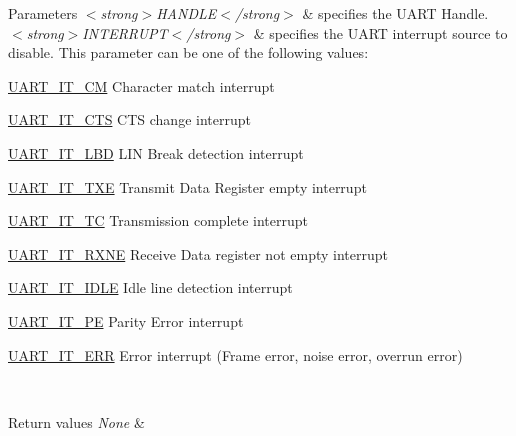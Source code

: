 \begin{DoxyParams}{Parameters}
{\em $<$strong$>$\+H\+A\+N\+D\+L\+E$<$/strong$>$} & specifies the U\+A\+RT Handle. \\
\hline
{\em $<$strong$>$\+I\+N\+T\+E\+R\+R\+U\+P\+T$<$/strong$>$} & specifies the U\+A\+RT interrupt source to disable. This parameter can be one of the following values\+: \begin{DoxyItemize}
\item \mbox{\hyperlink{group___u_a_r_t___interrupt__definition_ga4c22e866bce68975a180828012489106}{U\+A\+R\+T\+\_\+\+I\+T\+\_\+\+CM}} Character match interrupt \item \mbox{\hyperlink{group___u_a_r_t___interrupt__definition_ga986d271478550f9afa918262ca642333}{U\+A\+R\+T\+\_\+\+I\+T\+\_\+\+C\+TS}} C\+TS change interrupt \item \mbox{\hyperlink{group___u_a_r_t___interrupt__definition_gabca5e77508dc2dd9aa26fcb683d9b988}{U\+A\+R\+T\+\_\+\+I\+T\+\_\+\+L\+BD}} L\+IN Break detection interrupt \item \mbox{\hyperlink{group___u_a_r_t___interrupt__definition_ga552636e2af516d578856f5ee2ba71ed7}{U\+A\+R\+T\+\_\+\+I\+T\+\_\+\+T\+XE}} Transmit Data Register empty interrupt \item \mbox{\hyperlink{group___u_a_r_t___interrupt__definition_gab9a4dc4e8cea354fd60f4117513b2004}{U\+A\+R\+T\+\_\+\+I\+T\+\_\+\+TC}} Transmission complete interrupt \item \mbox{\hyperlink{group___u_a_r_t___interrupt__definition_gac1bedf7a65eb8c3f3c4b52bdb24b139d}{U\+A\+R\+T\+\_\+\+I\+T\+\_\+\+R\+X\+NE}} Receive Data register not empty interrupt \item \mbox{\hyperlink{group___u_a_r_t___interrupt__definition_ga9781808d4f9999061fc2da36572191d9}{U\+A\+R\+T\+\_\+\+I\+T\+\_\+\+I\+D\+LE}} Idle line detection interrupt \item \mbox{\hyperlink{group___u_a_r_t___interrupt__definition_ga55f922ddcf513509710ade5d7c40a1db}{U\+A\+R\+T\+\_\+\+I\+T\+\_\+\+PE}} Parity Error interrupt \item \mbox{\hyperlink{group___u_a_r_t___interrupt__definition_ga8eb26d8edd9bf78ae8d3ad87dd51b618}{U\+A\+R\+T\+\_\+\+I\+T\+\_\+\+E\+RR}} Error interrupt (Frame error, noise error, overrun error) \end{DoxyItemize}
\\
\hline
\end{DoxyParams}

\begin{DoxyRetVals}{Return values}
{\em None} & \\
\hline
\end{DoxyRetVals}
\mbox{\label{group___u_a_r_t___exported___macros_ga49eb5ea4996a957afeb8be2793ba3fe9}} 
